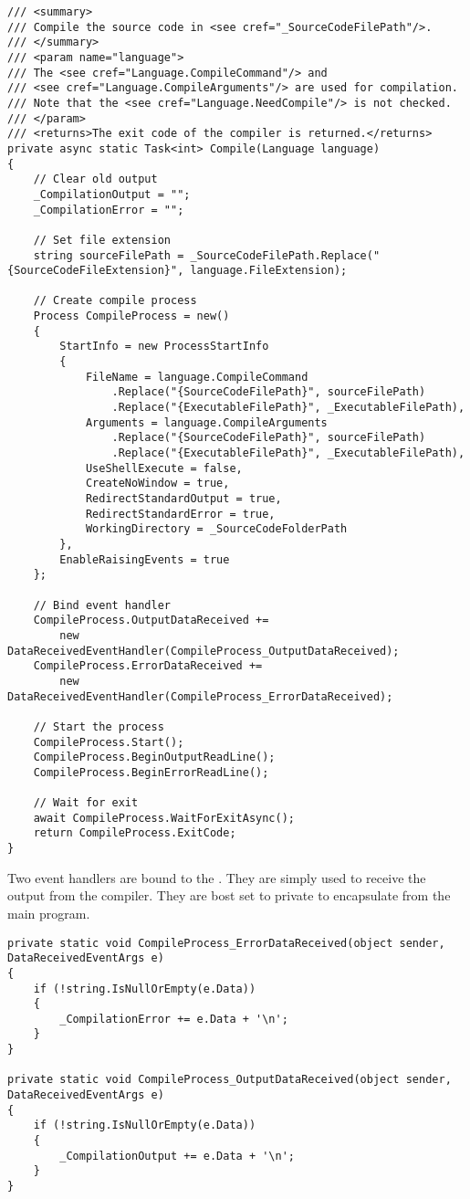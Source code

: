 \documentclass[report.tex]{subfiles}
\begin{document}
\begin{verbatim}
/// <summary>
/// Compile the source code in <see cref="_SourceCodeFilePath"/>.
/// </summary>
/// <param name="language">
/// The <see cref="Language.CompileCommand"/> and 
/// <see cref="Language.CompileArguments"/> are used for compilation.
/// Note that the <see cref="Language.NeedCompile"/> is not checked.
/// </param>
/// <returns>The exit code of the compiler is returned.</returns>
private async static Task<int> Compile(Language language)
{
    // Clear old output
    _CompilationOutput = "";
    _CompilationError = "";

    // Set file extension
    string sourceFilePath = _SourceCodeFilePath.Replace("{SourceCodeFileExtension}", language.FileExtension);

    // Create compile process
    Process CompileProcess = new()
    {
        StartInfo = new ProcessStartInfo
        {
            FileName = language.CompileCommand
                .Replace("{SourceCodeFilePath}", sourceFilePath)
                .Replace("{ExecutableFilePath}", _ExecutableFilePath),
            Arguments = language.CompileArguments
                .Replace("{SourceCodeFilePath}", sourceFilePath)
                .Replace("{ExecutableFilePath}", _ExecutableFilePath),
            UseShellExecute = false,
            CreateNoWindow = true,
            RedirectStandardOutput = true,
            RedirectStandardError = true,
            WorkingDirectory = _SourceCodeFolderPath
        },
        EnableRaisingEvents = true
    };

    // Bind event handler
    CompileProcess.OutputDataReceived +=
        new DataReceivedEventHandler(CompileProcess_OutputDataReceived);
    CompileProcess.ErrorDataReceived +=
        new DataReceivedEventHandler(CompileProcess_ErrorDataReceived);

    // Start the process
    CompileProcess.Start();
    CompileProcess.BeginOutputReadLine();
    CompileProcess.BeginErrorReadLine();

    // Wait for exit
    await CompileProcess.WaitForExitAsync();
    return CompileProcess.ExitCode;
}
\end{verbatim}

Two event handlers are bound to the . They are simply used to receive the output from the compiler. They are bost set to private to encapsulate from the main program.

\begin{verbatim}
private static void CompileProcess_ErrorDataReceived(object sender, DataReceivedEventArgs e)
{
    if (!string.IsNullOrEmpty(e.Data))
    {
        _CompilationError += e.Data + '\n';
    }
}

private static void CompileProcess_OutputDataReceived(object sender, DataReceivedEventArgs e)
{
    if (!string.IsNullOrEmpty(e.Data))
    {
        _CompilationOutput += e.Data + '\n';
    }
}
\end{verbatim}
\end{document}
